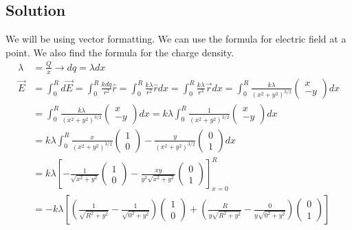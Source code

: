 \documentclass[12pt]{article}
\begin{document}
\subsection*{Solution}
We will be using vector formatting. We can use the formula for electric field at a point. We also find the formula for the charge density.
\begin{align*}
    \lambda &=  \frac{Q}{x} \rightarrow
    dq  =   \lambda dx\\
    \vec{E} &=  \int_{0}^{R} d\vec{E}
        =   \int_{0}^{R} \frac{k dq}{r^2} \hat{r}
        =   \int_{0}^{R} \frac{k \lambda}{r^2} \hat{r} dx
        =   \int_{0}^{R} \frac{k \lambda}{r^3} \vec{r} dx
        =   \int_{0}^{R} \frac{k \lambda}{(x^2 + y^2)^{3/2}} \begin{pmatrix}x\\-y\end{pmatrix} dx\\
        &=  \int_{0}^{R} \frac{k \lambda}{(x^2 + y^2)^{3/2}} \begin{pmatrix}x\\-y\end{pmatrix} dx
        =   k \lambda \int_{0}^{R} \frac{1}{(x^2 + y^2)^{3/2}} \begin{pmatrix}x\\-y\end{pmatrix} dx\\
        &=  k \lambda \int_{0}^{R} \frac{x}{(x^2 + y^2)^{3/2}} \begin{pmatrix}1\\0\end{pmatrix} - \frac{y}{(x^2 + y^2)^{3/2}} \begin{pmatrix}0\\1\end{pmatrix} dx\\
        &=  k \lambda \left[-\frac{1}{\sqrt{x^2 + y^2}} \begin{pmatrix}1\\0\end{pmatrix} - \frac{xy}{y^2\sqrt{x^2 + y^2}} \begin{pmatrix}0\\1\end{pmatrix}\right]_{x=0}^{R}\\
        &=  -k\lambda \left[\left(\frac{1}{\sqrt{R^2 + y^2}} - \frac{1}{\sqrt{0^2 + y^2}}\right) \begin{pmatrix}1\\0\end{pmatrix} + \left(\frac{R}{y\sqrt{R^2 + y^2}} - \frac{0}{y\sqrt{0^2 + y^2}}\right) \begin{pmatrix}0\\1\end{pmatrix}\right]\\

\end{align*}
\end{document}
